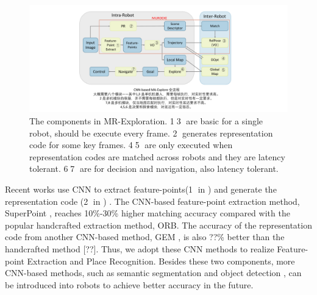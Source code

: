 \begin{figure}[t]
	\centering
	\includegraphics[width=0.99\linewidth]{fig/maexp.pdf}
    \caption{
        The components in MR-Exploration. \textcircled{1}\textcircled{3} are basic for a single robot, should be execute every frame. \textcircled{2} generates representation code for some key frames. \textcircled{4}\textcircled{5} are only executed when representation codes are matched across robots and they are latency tolerant.  \textcircled{6}\textcircled{7} are for decision and navigation, also latency tolerant.
    }
	\label{fig:maexp}
\end{figure}





Recent works use CNN to extract feature-points(\textcircled{1} in ) \cite{detone2018superpoint, simo2015discriminative, yi2016lift} and generate the representation code (\textcircled{2} in ) \cite{arandjelovic2016netvlad, radenovic2018fine}. 
The CNN-based feature-point extraction method, SuperPoint \cite{detone2018superpoint}, reaches 10\%-30\% higher matching accuracy compared with the popular handcrafted extraction method, ORB\cite{Mur-Artal:2017281}.
The accuracy of the representation code from another CNN-based method, GEM \cite{radenovic2018fine}, is also ??\% better than the handcrafted method [??].
Thus, we adopt these CNN methods to realize Feature-point Extraction and  Place Recognition. 
Besides these two components, more CNN-based methods, such as semantic segmentation \cite{long2015fully} and object detection \cite{ren2015faster}, can be introduced into robots to achieve better accuracy in the future.

